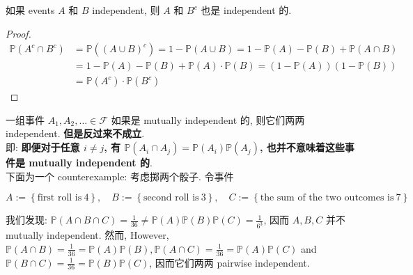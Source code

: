 \begin{proposition}

如果 events \(\mathit{A}\) 和 \(\mathit{B}\) independent, 则 \(\mathit{A}\) 和 \(\mathit{B}^{\mathit{c}}\) 也是 independent 的.

\end{proposition}

\begin{proof}

\[\begin{matrix}
{\mathbb{P}\left( {\mathit{A}^{\mathit{c}} \cap \mathit{B}^{\mathit{c}}} \right)} & {= \mathbb{P}\left( {(\mathit{A} \cup \mathit{B})^{\mathit{c}}} \right) = 1 - \mathbb{P}(\mathit{A} \cup \mathit{B}) = 1 - \mathbb{P}(\mathit{A}) - \mathbb{P}(\mathit{B}) + \mathbb{P}(\mathit{A} \cap \mathit{B})} \\
 & {= 1 - \mathbb{P}(\mathit{A}) - \mathbb{P}(\mathit{B}) + \mathbb{P}(\mathit{A}) \cdot \mathbb{P}(\mathit{B}) = (1 - \mathbb{P}(\mathit{A}))(1 - \mathbb{P}(\mathit{B}))} \\
 & {= \mathbb{P}\left( \mathit{A}^{\mathit{c}} \right) \cdot \mathbb{P}\left( \mathit{B}^{\mathit{c}} \right)}
\end{matrix}\]

\end{proof}

\begin{example}

一组事件 \(\mathit{A}_{1},\mathit{A}_{2},\ldots \in \mathcal{F}\) 如果是 mutually independent 的, 则它们两两 independent. \textbf{但是反过来不成立}.\\
即: \textbf{即便对于任意 \(\mathit{i} \neq \mathit{j}\), 有 \(\mathbb{P}(\mathit{A}_{\mathit{i}} \cap \mathit{A}_{\mathit{j}}) = \mathbb{P}(\mathit{A}_{\mathit{i}})\mathbb{P}(\mathit{A}_{\mathit{j}})\), 也并不意味着这些事件是 mutually independent 的}.\\
下面为一个 counterexample: 考虑掷两个骰子. 令事件

\[\mathit{A} := \left\{ {\text{first roll is}\ 4} \right\},\quad\mathit{B} := \left\{ {\text{second roll is}\ 3} \right\},\quad\mathit{C} := \left\{ {\text{the sum of the two outcomes is}\ 7} \right\}\]

我们发现: \(\mathbb{P}(\mathit{A} \cap \mathit{B} \cap \mathit{C}) = \frac{1}{36} \neq \mathbb{P}(\mathit{A})\mathbb{P}(\mathit{B})\mathbb{P}(\mathit{C}) = \frac{1}{6^{3}}\), 因而 \(\mathit{A},\mathit{B},\mathit{C}\) 并不 mutually independent. 然而, However, \(\mathbb{P}(\mathit{A} \cap \mathit{B}) = \frac{1}{36} = \mathbb{P}(\mathit{A})\mathbb{P}(\mathit{B}),\mathbb{P}(\mathit{A} \cap \mathit{C}) = \frac{1}{36} = \mathbb{P}(\mathit{A})\mathbb{P}(\mathit{C})\) and \(\mathbb{P}(\mathit{B} \cap \mathit{C}) = \frac{1}{36} = \mathbb{P}(\mathit{B})\mathbb{P}(\mathit{C})\), 因而它们两两 pairwise independent.

\end{example}

